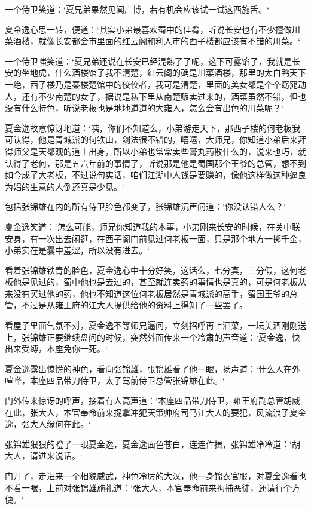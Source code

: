 一个侍卫笑道：‘夏兄弟果然见闻广博，若有机会应该试一试这西施舌。‘

夏金逸心思一转，便道：‘其实小弟最喜欢蜀中的佳肴，听说长安也有不少擅做川菜酒楼，就像长安都会市里面的红云阁和利人市的西子楼都应该有不错的川菜。‘

一个侍卫嗤笑道：‘夏兄弟还说在长安已经混熟了了呢，这下可露馅了，我就是长安的坐地虎，什么酒楼馆子我不清楚，红云阁的确是川菜酒楼，那里的太白鸭天下一绝，西子楼乃是秦楼楚馆中的佼佼者，我可是清楚，里面的美女都是个个窈窕动人，还有不少南楚的女子，据说是私下里从南楚贩卖过来的，酒菜虽然不错，但也没有什么特色，听说老板也是地地道道的大雍人，怎么会有出色的川菜呢？‘

夏金逸故意惊讶地道：‘咦，你们不知道么，小弟游走天下，那西子楼的何老板我可认得，他是青城派的何铁山，剑法很不错的，嘻嘻，大师兄，你知道小弟后来拜得师父是天都观的道士出身，所以小弟也常常卖些膏丸药散什么的，说来也巧，就认得了老何，那是五六年前的事情了，听说那是他是蜀国那个王爷的总管，想不到如今成了大老板，不过说句实话，咱们江湖中人钱是要赚的，像他这样做这种逼良为娼的生意的人倒还真是少见。‘

包括张锦雄在内的所有侍卫脸色都变了，张锦雄沉声问道：‘你没认错人么？‘

夏金逸笑道：‘怎么可能，师兄你知道我的本事，小弟刚来长安的时候，在关中联安身，有一次出去闲逛，在西子阁门前见过何老板一面，只是那个地方一掷千金，小弟实在是囊中羞涩，所以没有进去。‘

看着张锦雄铁青的脸色，夏金逸心中十分好笑，这话么，七分真，三分假，这何老板他是见过的，蜀中他也是去过的，甚至就连卖药的事情也是真的，可是何老板从来没有买过他的药，他也不知道这位何老板居然是青城派的高手，蜀国王爷的总管，不过是从雍王府的江大人提供给他的资料上得知了一些罢了。

看屋子里面气氛不对，夏金逸不等师兄逼问，立刻招呼再上酒菜，一坛美酒刚刚送上，张锦雄正要继续盘问的时候，突然外面传来一个冷肃的声音道：‘夏金逸，快出来受缚，本座免你一死。‘

夏金逸露出惊慌的神色，看向张锦雄，张锦雄看了他一眼，扬声道：‘什么人在外喧哗，本座四品带刀侍卫，太子驾前侍卫总管张锦雄在此。‘

门外传来惊讶的呼声，接着有人高声道：‘本座四品带刀侍卫，雍王府副总管胡威在此，张大人，本官奉命前来捉拿冲犯天策帅府司马江大人的要犯，风流浪子夏金逸，张大人缘何在此。‘

张锦雄狠狠的瞪了一眼夏金逸，夏金逸面色苍白，连连作揖，张锦雄冷冷道：‘胡大人，请进来说话。‘

门开了，走进来一个相貌威武，神色冷厉的大汉，他一身锦衣官服，对夏金逸看也不看一眼，上前对张锦雄施礼道：‘张大人，本官奉命前来拘捕恶徒，还请行个方便。‘

